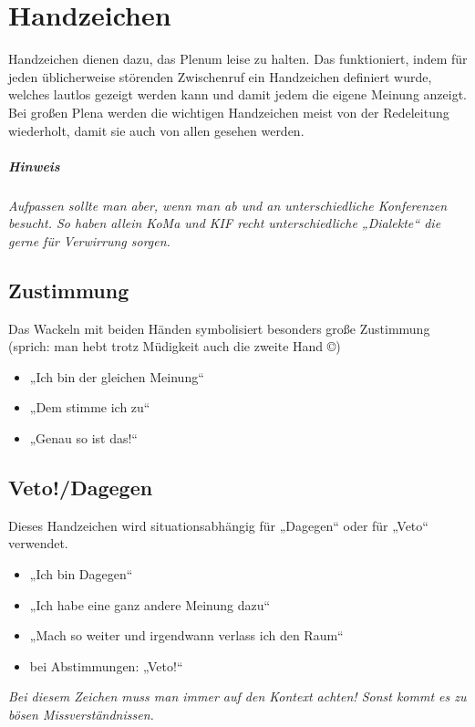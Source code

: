 \chapter{Handzeichen}\label{sec:handzeichen}

Handzeichen dienen dazu, das Plenum leise zu halten. Das funktioniert, indem
für jeden üblicherweise störenden Zwischenruf ein Handzeichen definiert wurde,
welches lautlos gezeigt werden kann und damit jedem die eigene Meinung anzeigt.
Bei großen Plena werden die wichtigen Handzeichen meist von der Redeleitung
wiederholt, damit sie auch von allen gesehen werden.

\paragraph{Hinweis} \emph{Aufpassen sollte man aber, wenn man ab und an
unterschiedliche Konferenzen besucht. So haben allein KoMa und KIF recht
unterschiedliche „Dialekte“ die gerne für Verwirrung sorgen.}

\section{Zustimmung}
Das Wackeln mit beiden Händen symbolisiert %
besonders große Zustimmung (sprich: man hebt trotz Müdigkeit auch die zweite
Hand ©) %
\begin{itemize}
	\item „Ich bin der gleichen Meinung“
	\item „Dem stimme ich zu“
	\item „Genau so ist das!“
\end{itemize}

\section{Veto!/Dagegen}
Dieses Handzeichen wird situationsabhängig für „Dagegen“ oder für „Veto“
verwendet.
\begin{itemize}
	\item „Ich bin Dagegen“
	\item „Ich habe eine ganz andere Meinung dazu“
	\item „Mach so weiter und irgendwann verlass ich den Raum“
	\item bei Abstimmungen: „Veto!“
\end{itemize}
\emph{Bei diesem Zeichen muss man immer auf den Kontext achten! Sonst kommt es
zu bösen Missverständnissen.}

